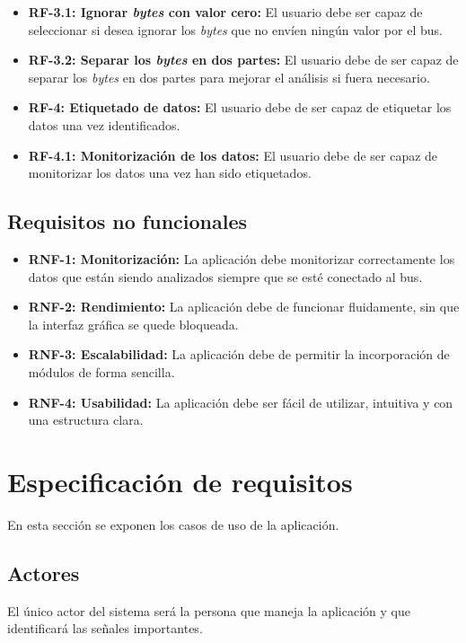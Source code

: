 \begin{itemize}
\item
\textbf{RF-3.1: Ignorar \emph{bytes} con valor cero:} El usuario debe ser capaz de seleccionar si desea ignorar los \emph{bytes} que no envíen ningún valor por el bus.
\item
\textbf{RF-3.2: Separar los \emph{bytes} en dos partes:} El usuario debe de ser capaz de separar los \emph{bytes} en dos partes para mejorar el análisis si fuera necesario.
\item
\textbf{RF-4: Etiquetado de datos:} El usuario debe de ser capaz de etiquetar los datos una vez identificados.
\item
\textbf{RF-4.1: Monitorización de los datos:} El usuario debe de ser capaz de monitorizar los datos una vez han sido etiquetados.
\end{itemize}


\subsection{Requisitos no funcionales}

\begin{itemize}
\item
\textbf{RNF-1: Monitorización:} La aplicación debe monitorizar correctamente los datos que están siendo analizados siempre que se esté conectado al bus.
\item
\textbf{RNF-2: Rendimiento:} La aplicación debe de funcionar fluidamente, sin que la interfaz gráfica se quede bloqueada.
\item
\textbf{RNF-3: Escalabilidad:} La aplicación debe de permitir la incorporación de módulos de forma sencilla.
\item
\textbf{RNF-4: Usabilidad:} La aplicación debe ser fácil de utilizar, intuitiva y con una estructura clara.
\end{itemize}

\section{Especificación de requisitos}

En esta sección se exponen los casos de uso de la aplicación.

\subsection{Actores}

El único actor del sistema será la persona que maneja la aplicación y que identificará las señales importantes.

